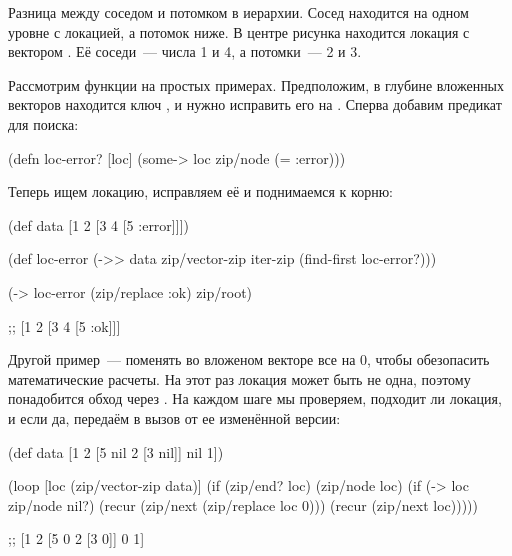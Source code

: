 
Разница между соседом и потомком в иерархии. Сосед находится на одном уровне с
локацией, а потомок ниже. В центре рисунка находится локация с вектором \code{[2 3]}.
Её соседи~--- числа 1 и 4, а потомки~--- 2 и 3.

\begin{figure}[H]
  \centering
  
  \label{fig:chart-zip-12}
\end{figure}

Рассмотрим функции на простых примерах. Предположим, в глубине вложенных
векторов находится ключ , и нужно исправить его на . Сперва добавим
предикат для поиска:

\begin{english}
  \begin{clojure}
(defn loc-error? [loc]
  (some-> loc zip/node (= :error)))
  \end{clojure}
\end{english}

Теперь ищем локацию, исправляем её и поднимаемся к корню:

\begin{english}
  \begin{clojure}
(def data [1 2 [3 4 [5 :error]]])

(def loc-error
  (->> data
       zip/vector-zip
       iter-zip
       (find-first loc-error?)))

(-> loc-error
    (zip/replace :ok)
    zip/root)

;; [1 2 [3 4 [5 :ok]]]
  \end{clojure}
\end{english}


Другой пример~--- поменять во вложеном векторе все  на 0, чтобы
обезопасить математические расчеты. На этот раз локация может быть не одна,
поэтому понадобится обход через . На каждом шаге мы проверяем,
подходит ли локация, и если да, передаём в  вызов  от
ее изменённой версии:

\begin{english}
  \begin{clojure}
(def data
  [1 2 [5 nil 2 [3 nil]] nil 1])

(loop [loc (zip/vector-zip data)]
  (if (zip/end? loc)
    (zip/node loc)
    (if (-> loc zip/node nil?)
      (recur (zip/next (zip/replace loc 0)))
      (recur (zip/next loc)))))

;; [1 2 [5 0 2 [3 0]] 0 1]
  \end{clojure}
\end{english}

